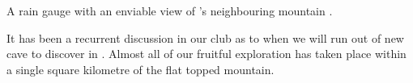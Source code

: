 \begin{marginfigure}
\checkoddpage \ifoddpage \forcerectofloat \else \forceversofloat \fi
\centering
 \caption{A rain gauge with an enviable view of 's neighbouring mountain . }
 \label{rain gauge}
\end{marginfigure}

It has been a recurrent discussion in our club as to when we will run
out of new cave to discover in . Almost all of our fruitful
exploration has taken place within a single square kilometre of the flat
topped mountain.

